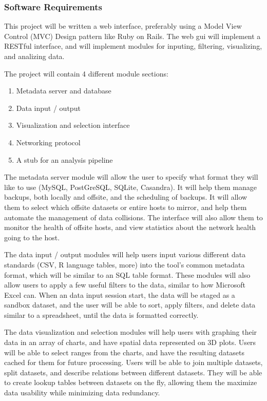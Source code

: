 \subsubsection{Software Requirements}
This project will be written a web interface, preferably using a Model View
Control (MVC) Design pattern like Ruby on Rails. The web gui will implement
a RESTful interface, and will implement modules for inputing, filtering, 
visualizing, and analizing data.

The project will contain 4 different module sections:
\begin{enumerate}
	\item Metadata server and database
	\item Data input / output
	\item Visualization and selection interface
	\item Networking protocol
	\item A stub for an analysis pipeline
\end{enumerate}

The metadata server module will allow the user to specify what format they 
will like to use (MySQL, PostGreSQL, SQLite, Casandra). It will help them
manage backups, both locally and offsite, and the scheduling of backups. It will
allow them to select which offsite datasets or entire hosts to mirror, and
help them automate the management of data collisions. The interface will also
allow them to monitor the health of offsite hosts, and view statistics
about the network health going to the host.

The data input / output modules will help users input various different
data standards (CSV, R language tables, more) into the tool's common 
metadata format, which will be similar to an SQL table format. These modules
will also allow users to apply a few useful filters to the data, similar to
how Microsoft Excel can. When an data input session start, the data will be 
staged as a sandbox dataset, and the user will be able to sort, apply filters,
and delete data similar to a spreadsheet, until the data is formatted correctly.

The data visualization and selection modules will help users with graphing
their data in an array of charts, and have spatial data represented on 
3D plots. Users will be able to select ranges from the charts, and have the
resulting datasets cached for them for future processing. Users will be able
to join multiple datasets, split datasets, and describe relations between 
different datasets. They will be able to create lookup tables between datasets
on the fly, allowing them the maximize data usability while minimizing data 
redundancy.

